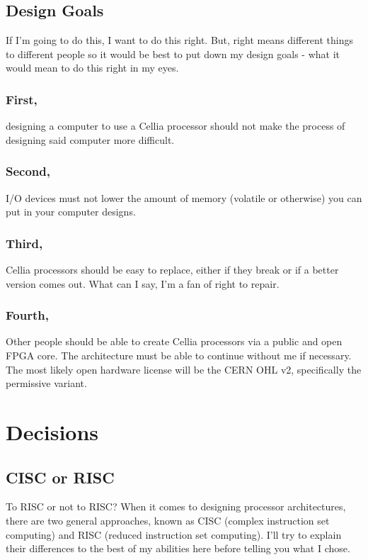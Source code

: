 \documentclass[letterpaper,12pt]{book}
\begin{document}
\chapter{Design Goals}

If I'm going to do this, I want to do this right. But, right means different things to different people so it would be best to put down my design goals - what it would mean to do this right in my eyes.

\section*{First,}

designing a computer to use a Cellia processor should not make the process of designing said computer more difficult.

\section*{Second,}

I/O devices must not lower the amount of memory (volatile or otherwise) you can put in your computer designs.

\section*{Third,}

Cellia processors should be easy to replace, either if they break or if a better version comes out. What can I say, I'm a fan of right to repair.

\section*{Fourth,}

Other people should be able to create Cellia processors via a public and open FPGA core. The architecture must be able to continue without me if necessary. The most likely open hardware license will be the CERN OHL v2, specifically the permissive variant.

\part{Decisions}

\chapter{CISC or RISC}

To RISC or not to RISC? When it comes to designing processor architectures, there are two general approaches, known as CISC (complex instruction set computing) and RISC (reduced instruction set computing). I'll try to explain their differences to the best of my abilities here before telling you what I chose.
\end{document}
